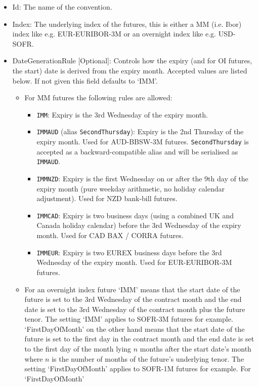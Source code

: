 \begin{itemize}
\item Id: The name of the convention.
\item Index: The underlying index of the futures, this is either a MM (i.e. Ibor) index like e.g. EUR-EURIBOR-3M or an
  overnight index like e.g. USD-SOFR.
\item DateGenerationRule [Optional]: Controls how the expiry (and for OI futures, the start) date is derived from the
  expiry month. Accepted values are listed below. If not given this field defaults to `IMM'.
  \begin{itemize}
  \item For MM futures the following rules are allowed:
    \begin{itemize}
    \item \texttt{IMM}: Expiry is the 3rd Wednesday of the expiry month.
    \item \texttt{IMMAUD} (alias \texttt{SecondThursday}): Expiry is the 2nd Thursday of the expiry month. Used for
      AUD-BBSW-3M futures. \texttt{SecondThursday} is accepted as a backward-compatible alias and will be serialised
      as \texttt{IMMAUD}.
    \item \texttt{IMMNZD}: Expiry is the first Wednesday on or after the 9th day of the expiry month (pure weekday
      arithmetic, no holiday calendar adjustment). Used for NZD bank-bill futures.
    \item \texttt{IMMCAD}: Expiry is two business days (using a combined UK and Canada holiday calendar) before the
      3rd Wednesday of the expiry month. Used for CAD BAX / CORRA futures.
    \item \texttt{IMMEUR}: Expiry is two EUREX business days before the 3rd Wednesday of the expiry month. Used for
      EUR-EURIBOR-3M futures.
    \end{itemize}
  \item For an overnight index future `IMM' means that the start date of the future is set to the 3rd Wednesday of the
    contract month and the end date is set to the 3rd Wednesday of the contract month plus the future tenor. The setting
    `IMM' applies to SOFR-3M futures for example. `FirstDayOfMonth' on the other hand means that the start date of the
    future is set to the first day in the contract month and the end date is set to the
    first day of the month lying $n$ months after the start date's month where $n$ is the number of months of the
    future's underlying tenor. The setting `FirstDayOfMonth' applies to SOFR-1M futures for example. For `FirstDayOfMonth'

\end{itemize}
\end{itemize}
